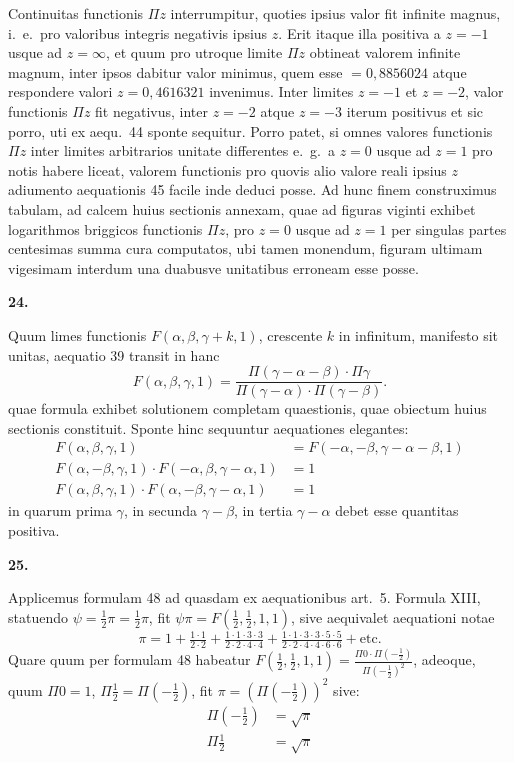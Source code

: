 \documentclass[12pt,a4paper]{article}
\newcommand{\art}[1]{\par\medskip\noindent\textbf{#1.}\par\nopagebreak\smallskip}
\begin{document}
Continuitas functionis $\Pi z$ interrumpitur, quoties ipsius valor fit infinite magnus, i.\ e.\ pro valoribus integris negativis ipsius $z$. Erit itaque illa positiva a $z=-1$ usque ad $z=\infty$, et quum pro utroque limite $\Pi z$ obtineat valorem infinite magnum, inter ipsos dabitur valor minimus, quem esse $=0{,}8856024$ atque respondere valori $z=0{,}4616321$ invenimus. Inter limites $z=-1$ et $z=-2$, valor functionis $\Pi z$ fit negativus, inter $z=-2$ atque $z=-3$ iterum positivus et sic porro, uti ex aequ.\ 44 sponte sequitur. Porro patet, si omnes valores functionis $\Pi z$ inter limites arbitrarios unitate differentes e.\ g.\ a $z=0$ usque ad $z=1$ pro notis habere liceat, valorem functionis pro quovis alio valore reali ipsius $z$ adiumento aequationis 45 facile inde deduci posse. Ad hunc finem construximus tabulam, ad calcem huius sectionis annexam, quae ad figuras viginti exhibet logarithmos briggicos functionis $\Pi z$, pro $z=0$ usque ad $z=1$ per singulas partes centesimas summa cura computatos, ubi tamen monendum, figuram ultimam vigesimam interdum una duabusve unitatibus erroneam esse posse.

\art{24}

Quum limes functionis $F(\alpha,\beta,\gamma+k,1)$, crescente $k$ in infinitum, manifesto sit unitas, aequatio 39 transit in hanc
\begin{equation}
F(\alpha,\beta,\gamma,1) = \frac{\Pi(\gamma-\alpha-\beta)\cdot\Pi\gamma}{\Pi(\gamma-\alpha)\cdot\Pi(\gamma-\beta)}.\tag{[48]}
\end{equation}
quae formula exhibet solutionem completam quaestionis, quae obiectum huius sectionis constituit. Sponte hinc sequuntur aequationes elegantes:
\begin{align}
F(\alpha,\beta,\gamma,1) &= F(-\alpha,-\beta,\gamma-\alpha-\beta,1)\tag{[49]}\\
F(\alpha,-\beta,\gamma,1)\cdot F(-\alpha,\beta,\gamma-\alpha,1) &= 1\tag{[50]}\\
F(\alpha,\beta,\gamma,1)\cdot F(\alpha,-\beta,\gamma-\alpha,1) &= 1\tag{[51]}
\end{align}
in quarum prima $\gamma$, in secunda $\gamma-\beta$, in tertia $\gamma-\alpha$ debet esse quantitas positiva.

\art{25}

Applicemus formulam 48 ad quasdam ex aequationibus art.\ 5. Formula XIII, statuendo $\psi=\frac{1}{2}\pi=\frac{1}{2}\pi$, fit $\psi\pi=F(\frac{1}{2},\frac{1}{2},1,1)$, sive aequivalet aequationi notae
\[
\pi = 1 + \tfrac{1\cdot1}{2\cdot2} + \tfrac{1\cdot1\cdot3\cdot3}{2\cdot2\cdot4\cdot4} + \tfrac{1\cdot1\cdot3\cdot3\cdot5\cdot5}{2\cdot2\cdot4\cdot4\cdot6\cdot6} + \text{etc.}
\]
Quare quum per formulam 48 habeatur $F(\frac{1}{2},\frac{1}{2},1,1)=\frac{\Pi 0\cdot\Pi(-\frac{1}{2})}{\Pi(-\frac{1}{2})^2}$, adeoque, quum $\Pi 0=1$, $\Pi\frac{1}{2}=\Pi(-\frac{1}{2})$, fit $\pi=(\Pi(-\frac{1}{2}))^2$ sive:
\begin{align}
\Pi(-\tfrac{1}{2}) &= \surd\pi\tag{[52]}\\
\Pi\tfrac{1}{2} &= \surd\pi\tag{[53]}
\end{align}
\end{document}
